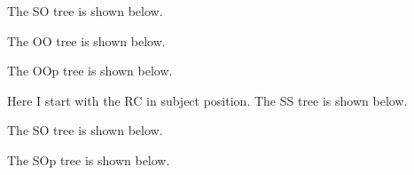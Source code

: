 \documentclass{article}
\begin{document}
The SO tree is shown below.
%
\begin{center}

\end{center}
%
\newpage
The OO tree is shown below.
\begin{center}
    
\end{center}
%
\newpage
The OOp tree is shown below.
%
\begin{center}

\end{center}

\newpage

Here I start with the RC in subject position. The SS tree is shown below.
%
\begin{center}

\end{center}
%
\newpage
The SO tree is shown below.
\begin{center}
    
\end{center}
%
\newpage
The SOp tree is shown below.
%
\begin{center}

\end{center}
\end{document}
